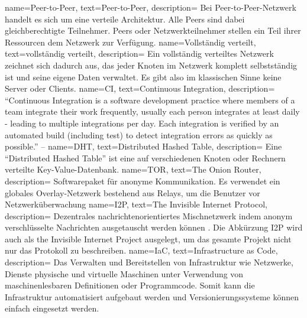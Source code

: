 \makeglossaries
                 { name={Peer-to-Peer},                  text={Peer-to-Peer},           description={{
    Bei Peer-to-Peer-Netzwerk handelt es sich um eine verteile Architektur. Alle Peers sind dabei gleichberechtigte Teilnehmer. Peers oder Netzwerkteilnehmer stellen ein Teil ihrer Ressourcen dem Netzwerk zur Verfügung.
}}}
 { name={Vollständig verteilt},                   text={vollständig verteilt},            description={{
    Ein vollständig verteiltes Netzwerk zeichnet sich dadurch aus, das jeder Knoten
    im Netzwerk komplett selbstständig ist und seine eigene Daten verwaltet. Es gibt also im klassischen Sinne keine Server oder Clients.
}}}
                  { name={CI},        text={Continuous Integration}, description={{
    ``Continuous Integration is a software development practice where members
    of a team integrate their work frequently,                                 usually each person integrates
    at least daily - leading to multiple integrations per day. Each integration
    is verified by an automated build (including test) to detect integration
    errors as quickly as possible.'' -- \cite{fowler_continuos_2014}
}}}
                 { name={DHT},        text={Distributed Hashed Table},                    description={{
    Eine ``Distributed Hashed Table'' ist eine auf verschiedenen Knoten oder Rechnern verteilte Key-Value-Datenbank.
}}}
                 { name={TOR},        text={The Onion Router},                          description={{
    Softwarepaket für anonyme Kommunikation. Es verwendet ein globales Overlay-Netzwerk bestehend aus Relays, um die Benutzer vor Netzwerküberwachung 
}}}
                 { name={I2P},        text={The Invisible Internet Protocol},                          description={{
            Dezentrales nachrichtenorientiertes Mischnetzwerk indem anonym verschlüsselte Nachrichten ausgetauscht werden können \parencite[p.~1]{zantout_i2p_2011}. Die Abkürzung I2P wird auch als the Invisible Internet Project ausgelegt, um das gesamte Projekt nicht nur das Protokoll zu beschreiben.
}}}
                { name={IaC}, text={Infrastructure as Code}, description={{
    Das Verwalten und Bereitstellen von Infrastruktur wie Netzwerke, Dienste physische und virtuelle Maschinen unter Verwendung von maschinenlesbaren Definitionen oder Programmcode.
    Somit kann die Infrastruktur automatisiert aufgebaut werden und Versionierungssysteme können einfach eingesetzt werden.
}}}
